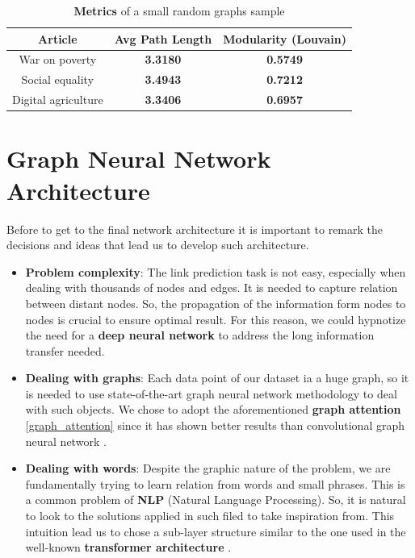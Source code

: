 \documentclass[11pt]{article}
\begin{document}
	\begin{table}[h!]
		\label{table_0_1}
		\centering
		\begin{tabular}{ccc}
			\toprule
			Article & \textbf{Avg Path Length} & \textbf{Modularity (Louvain)} \\
			\midrule
			War on poverty & \textbf{3.3180} & \textbf{0.5749} \\
			Social equality & \textbf{3.4943} & \textbf{0.7212} \\
			Digital agriculture & \textbf{3.3406} & \textbf{0.6957} \\
			\bottomrule 
		\end{tabular}
		\caption{\textbf{Metrics} of a small random graphs sample}
	\end{table}
	
	\section{Graph Neural Network Architecture}
	Before to get to the final network architecture it is important to remark the decisions and ideas that lead us to develop such architecture. 
	\begin{itemize}
		\item{\textbf{Problem complexity}}: The link prediction task is not easy, especially when dealing with thousands of nodes and edges. It is needed to capture relation between distant nodes. So, the propagation of the information form nodes to nodes is crucial to ensure optimal result. For this reason, we could hypnotize the need for a \textbf{deep neural network} to address the long information transfer needed. 
		
		\item{\textbf{Dealing with graphs}}: Each data point of our dataset ia a huge graph, so it is needed to use state-of-the-art graph neural network methodology to deal with such objects. We chose to adopt the aforementioned \textbf{graph attention} \cite{veličković2018graphattentionnetworks} \ref{graph_attention} since it has shown better results than convolutional graph neural network \cite{kipf2017semisupervisedclassificationgraphconvolutional}. 
		
		\item{\textbf{Dealing with words}}: Despite the graphic nature of the problem, we are fundamentally trying to learn relation from words and small phrases. This is a common problem of \textbf{NLP} (Natural Language Processing). So, it is natural to look to the solutions applied in such filed to take inspiration from. This intuition lead us to chose a sub-layer structure similar to the one used in the well-known \textbf{transformer architecture} \cite{vaswani2023attentionneed}.   
	\end{itemize}
	
\end{document}
